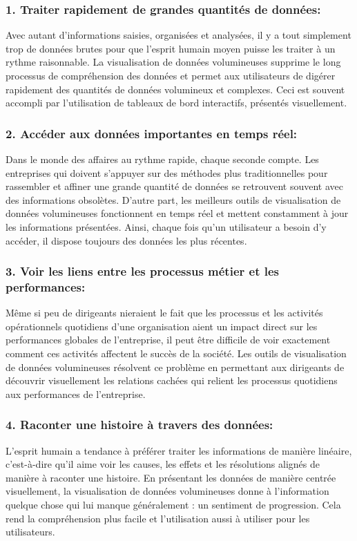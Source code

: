 \documentclass[french, a4paper, 12pt]{report}
\begin{document}
\subsubsection{1. Traiter rapidement de grandes quantités de données:}
Avec autant d’informations saisies, organisées et analysées, il y a tout simplement trop de données brutes pour que l’esprit humain moyen puisse les traiter à un rythme raisonnable. La visualisation de données volumineuses supprime le long processus de compréhension des données et permet aux utilisateurs de digérer rapidement des quantités de données volumineux et complexes. Ceci est souvent accompli par l’utilisation de tableaux de bord interactifs, présentés visuellement.
\subsubsection{2. Accéder aux données importantes en temps réel:}
Dans le monde des affaires au rythme rapide, chaque seconde compte. Les entreprises qui doivent s’appuyer sur des méthodes plus traditionnelles pour rassembler et affiner une grande quantité de données se retrouvent souvent avec des informations obsolètes. D'autre part, les meilleurs outils de visualisation de données volumineuses fonctionnent en temps réel et mettent constamment à jour les informations présentées. Ainsi, chaque fois qu'un utilisateur a besoin d'y accéder, il dispose toujours des données les plus récentes.
\subsubsection{3. Voir les liens entre les processus métier et les performances:}
Même si peu de dirigeants nieraient le fait que les processus et les activités opérationnels quotidiens d’une organisation aient un impact direct sur les performances globales de l’entreprise, il peut être difficile de voir exactement comment ces activités affectent le succès de la société. Les outils de visualisation de données volumineuses résolvent ce problème en permettant aux dirigeants de découvrir visuellement les relations cachées qui relient les processus quotidiens aux performances de l'entreprise.
\subsubsection{4. Raconter une histoire à travers des données:}
L'esprit humain a tendance à préférer traiter les informations de manière linéaire, c'est-à-dire qu'il aime voir les causes, les effets et les résolutions alignés de manière à raconter une histoire. En présentant les données de manière centrée visuellement, la visualisation de données volumineuses donne à l’information quelque chose qui lui manque généralement : un sentiment de progression. Cela rend la compréhension plus facile et l’utilisation aussi à utiliser pour les utilisateurs.
\end{document}
